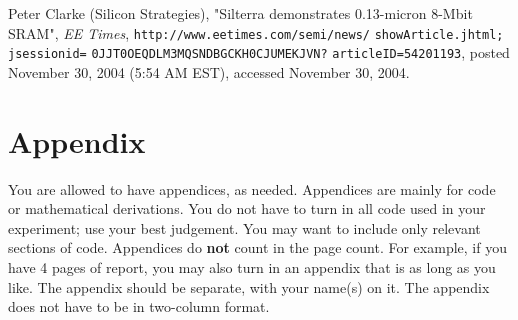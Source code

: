 \documentclass[final]{ieee}
\begin{document}
\begin{thebibliography}{99}
 Peter Clarke (Silicon Strategies), "Silterra demonstrates
0.13-micron 8-Mbit SRAM", {\it EE Times},
\texttt{http://www.eetimes.com/semi/news/}
\texttt{showArticle.jhtml;}
\texttt{jsessionid=}
\texttt{0JJT0OEQDLM3MQSNDBGCKH0CJUMEKJVN?}
\texttt{articleID=54201193},
posted November 30, 2004 (5:54 AM EST), accessed November 30, 2004.



\end{thebibliography}

\newpage

\hbox{}


\newpage

\thispagestyle{empty}

\section*{Appendix}
You are allowed to have appendices, as needed. Appendices are mainly for
code or mathematical derivations. You do not have to turn in all code
used in your experiment; use your best judgement. You may want to
include only relevant sections of code. Appendices do {\bf not} count in the
page count. For example, if you have 4 pages of report, you may also
turn in an appendix that is as long as you like. The appendix should be
separate, with your name(s) on it. The appendix does not have to be in two-column
format. 
\end{document}
